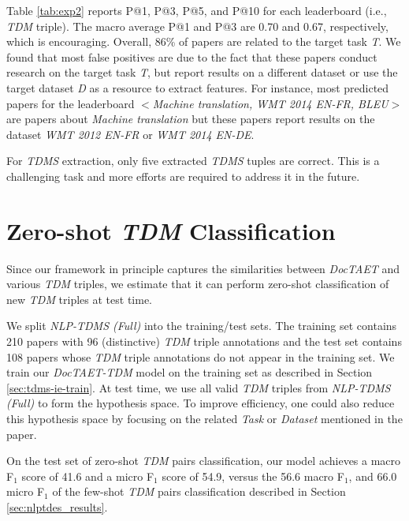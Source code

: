 \documentclass[11pt,a4paper]{article}
\begin{document}
Table \ref{tab:exp2} reports P@1, P@3, P@5, and P@10 for each leaderboard (i.e., \emph{TDM} triple). The  macro average P@1 and P@3 are 0.70 and 0.67, respectively, which is encouraging. Overall, 86\% of papers 
are related to the target task \emph{T}. We found that most false positives are due to the fact that these papers conduct research on the target task \emph{T}, but report results on a different dataset 
or use the target dataset \emph{D} as a resource to extract features. For instance, most predicted papers for the leaderboard $<$\emph{Machine translation, WMT 2014 EN-FR, BLEU}$>$ are papers about \emph{Machine translation} but 
these papers report results on the dataset \emph{WMT 2012 EN-FR} or \emph{WMT 2014 EN-DE}. 

For \emph{TDMS} extraction, only five extracted \emph{TDMS} tuples are correct. This is a challenging task and more efforts are required to address it in the future. 









\section{Zero-shot \emph{TDM} Classification}\label{sec:zeroshot_results}
Since our framework in principle captures the similarities between \emph{DocTAET} and various \emph{TDM} triples, we estimate that it can perform zero-shot classification of new \emph{TDM} triples at test time. 

We split \emph{NLP-TDMS (Full)} into the training/test sets. The training set contains 210 papers with 96 (distinctive) \emph{TDM} triple annotations and the test set contains 108 papers whose \emph{TDM} triple annotations do not appear in the training set. We train our \emph{DocTAET-TDM} model on the training set as described in Section \ref{sec:tdms-ie-train}. At test time, we use all valid \emph{TDM} triples from \emph{NLP-TDMS (Full)} to form the hypothesis space. To improve efficiency, one could also reduce this hypothesis space by focusing on the related \emph{Task} or \emph{Dataset} mentioned in the paper. 

On the test set of zero-shot \emph{TDM} pairs classification, our model achieves a macro F$_1$ score of 41.6 and a micro F$_1$ score of 54.9, versus the 56.6 macro F$_1$, and 66.0 micro F$_1$ of the few-shot \emph{TDM} pairs classification described in Section \ref{sec:nlptdes_results}. 
\end{document}
